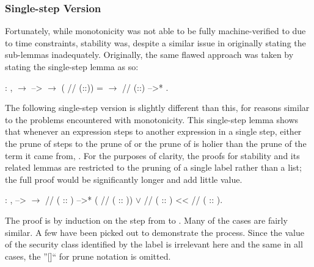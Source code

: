 \documentclass[12pt]{report}
\begin{document}
\subsubsection{Single-step Version}



 Fortunately, while monotonicity was not able to be fully
machine-verified to due to time constraints, stability was, despite
a similar issue in originally stating the sub-lemmas
inadequately. Originally, the same flawed approach was taken by
stating the single-step lemma as so: \begin{coqdoccode}
\coqdocemptyline
\coqdocindent{1.00em}
  : \coqdockw{\ensuremath{\forall}}   ,\coqdoceol
\coqdocindent{2.00em}
  \ensuremath{\rightarrow}\coqdoceol
\coqdocindent{2.00em}
 -->  \ensuremath{\rightarrow}\coqdoceol
\coqdocindent{2.00em}
(  //\coqdocvar{\_} (::)) =  \ensuremath{\rightarrow}\coqdoceol
\coqdocindent{2.00em}
  //\coqdocvar{\_} (::) -->* .\coqdoceol
\coqdocemptyline
\end{coqdoccode}
The following single-step version is slightly different than
this, for reasons similar to the problems encountered with
    monotonicity. This single-step lemma shows that whenever an
    expression  steps to another expression  in a single step,
    either the prune of  steps to the prune of  or the prune of
     is holier than the prune of the term it came from, . For
    the purposes of clarity, the proofs for stability and its related
    lemmas are restricted to the pruning of a single label rather
    than a list; the full proof would be significantly longer and add
    little value. \begin{coqdoccode}
\coqdocemptyline
\coqdocindent{1.00em}
  : \coqdockw{\ensuremath{\forall}}   ,\coqdoceol
\coqdocindent{2.00em}
 -->  \ensuremath{\rightarrow}\coqdoceol
\coqdocindent{2.00em}
  //\coqdocvar{\_} ( :: ) -->* (  //\coqdocvar{\_} ( :: ))\coqdoceol
\coqdocindent{2.00em}
\ensuremath{\lor}\coqdoceol
\coqdocindent{2.00em}
  //\coqdocvar{\_} ( :: ) <<   //\coqdocvar{\_} ( :: ).\coqdoceol
\coqdocemptyline
\end{coqdoccode}
The proof is by induction on the step from  to . Many of
the cases are fairly similar. A few have been picked out to
demonstrate the process. Since the value of the security class
identified by the label is irrelevant here and the same in all cases,
the ''\coqdocvar{\_}[]`` for prune notation is omitted. 
\end{document}
